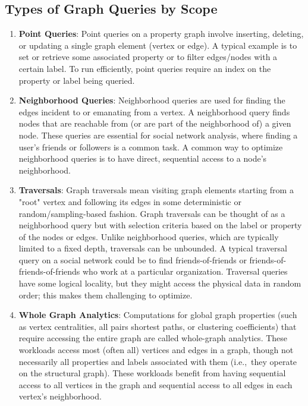 \subsection{Types of Graph Queries by Scope}
\label{back:workloads:oltp}
\begin{enumerate}
    \item \textbf{Point Queries}: Point queries on a property graph involve inserting, deleting, or updating a single graph element (vertex or edge). A typical example is to set or retrieve some associated property or to filter edges/nodes with a certain label. To run efficiently, point queries require an index on the property or label being queried.

    \item \textbf{Neighborhood Queries}: Neighborhood queries are used for finding the edges incident to or emanating from a vertex. A neighborhood query finds nodes that are reachable from (or are part of the neighborhood of) a given node. These queries are essential for social network analysis, where finding a user's friends or followers is a common task. A common way to optimize neighborhood queries is to have direct, sequential access to a node's neighborhood.

    \item \textbf{Traversals}: Graph traversals mean visiting graph elements starting from a "root" vertex and following its edges in some deterministic or random/sampling-based fashion.  Graph traversals can be thought of as a neighborhood query but with selection criteria based on the label or property of the nodes or edges. Unlike neighborhood queries, which are typically limited to a fixed depth, traversals can be unbounded. A typical traversal query on a social network could be to find friends-of-friends or friends-of-friends-of-friends who work at a particular organization. Traversal queries have some logical locality, but they might access the physical data in random order; this makes them challenging to optimize.
    
    \item \textbf{Whole Graph Analytics}: Computations for global graph properties (such as vertex centralities, all pairs shortest paths, or clustering coefficients) that require accessing the entire graph are called whole-graph analytics. These workloads access most (often all) vertices and edges in a graph, though not necessarily all properties and labels associated with them (i.e.,\ they operate on the structural graph). These workloads benefit from having sequential access to all vertices in the graph and sequential access to all edges in each vertex's neighborhood.
    
\end{enumerate}

